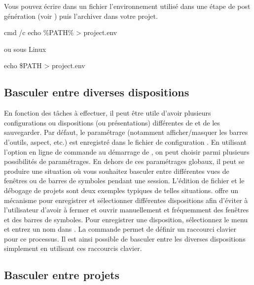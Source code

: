 Vous pouvez écrire dans un fichier  l'environnement utilisé dans une étape de post génération (voir ) puis l'archiver dans votre projet.

\begin{cmd}
cmd /c echo \%PATH\%  > project.env
\end{cmd}

ou sous Linux

\begin{cmd}
echo \$PATH > project.env
\end{cmd}

\subsection{Basculer entre diverses dispositions}

En fonction des tâches à effectuer, il peut être utile d'avoir plusieurs configurations ou dispositions (ou présentations) différentes de  \codeblocks et de les sauvegarder. Par défaut, le paramétrage (notamment afficher/masquer les barres d'outils, aspect, etc.) est enregistré dans le fichier de configuration . En utilisant l'option en ligne de commande  au démarrage de \codeblocks, on peut choisir parmi plusieurs possibilités de paramétrages. En dehors de ces paramétrages globaux, il peut se produire une situation où vous souhaitez basculer entre différentes vues de fenêtres ou de barres de symboles pendant une session. L'édition de fichier et le débogage de projets sont deux exemples typiques de telles situations. \codeblocks offre un mécanisme pour enregistrer et sélectionner différentes dispositions afin d'éviter à l'utilisateur d'avoir à fermer et ouvrir manuellement et fréquemment des fenêtres et des barres de symboles. Pour enregistrer une disposition, sélectionnez le menu  et entrez un nom dans . La commande  permet de définir un raccourci clavier pour ce processus. Il est ainsi possible de basculer entre les diverses dispositions simplement en utilisant ces raccourcis clavier.


\subsection{Basculer entre projets}

